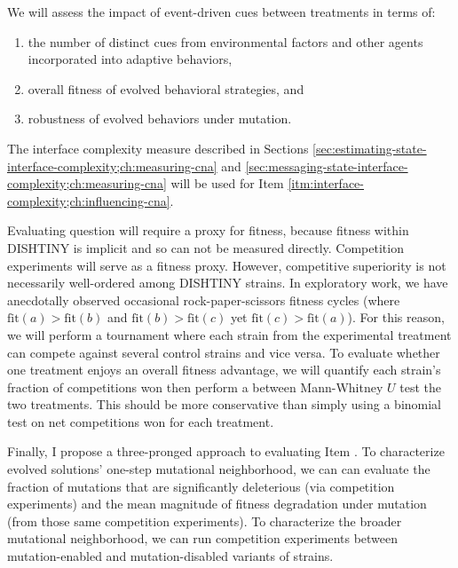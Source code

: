 We will assess the impact of event-driven cues between treatments in terms of:
\begin{enumerate}
  \item the number of distinct cues from environmental factors and other agents incorporated into adaptive behaviors,
  \label{itm:interface-complexity;ch:influencing-cna}
  \item overall fitness of evolved behavioral strategies, and
  \label{itm:fitness;ch:influencing-cna}
  \item robustness of evolved behaviors under mutation.
  \label{itm:robustness;ch:influencing-cna}
\end{enumerate}

The interface complexity measure described in Sections \ref{sec:estimating-state-interface-complexity;ch:measuring-cna} and \ref{sec:messaging-state-interface-complexity;ch:measuring-cna} will be used for Item \ref{itm:interface-complexity;ch:influencing-cna}.

Evaluating question \label{itm:fitness;ch:influencing-cna} will require a proxy for fitness, because fitness within DISHTINY is implicit and so can not be measured directly.
Competition experiments will serve as a fitness proxy.
However, competitive superiority is not necessarily well-ordered among DISHTINY strains.
In exploratory work, we have anecdotally observed occasional rock-paper-scissors fitness cycles (where $\mathrm{fit}(a) > \mathrm{fit}(b)$ and $\mathrm{fit}(b) > \mathrm{fit}(c)$ yet $\mathrm{fit}(c) > \mathrm{fit}(a)$).
For this reason, we will perform a tournament where each strain from the experimental treatment can compete against several control strains and vice versa.
To evaluate whether one treatment enjoys an overall fitness advantage, we will quantify each strain's fraction of competitions won then perform a between Mann-Whitney $U$ test the two treatments.
This should be more conservative than simply using a binomial test on net competitions won for each treatment.

Finally, I propose a three-pronged approach to evaluating Item \label{itm:robustness;ch:influencing-cna}.
To characterize evolved solutions' one-step mutational neighborhood, we can can evaluate the fraction of mutations that are significantly deleterious (via competition experiments) and the mean magnitude of fitness degradation under mutation (from those same competition experiments).
To characterize the broader mutational neighborhood, we can run competition experiments between mutation-enabled and mutation-disabled variants of strains.

